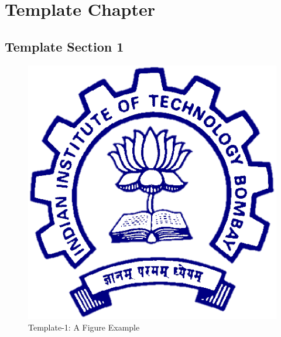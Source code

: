 \chapter{Template Chapter}
\thispagestyle{fancy}

%
%
%
%
%
%
%
%
%

\section{Template Section 1}
\blindtext %

\begin{figure}
    \centering
    \includegraphics[scale=0.3]{Figures/Foreword/iitb_logo.png}
    \caption{Template-1: A Figure Example}
    \label{fig:template_a_figure}
\end{figure}

